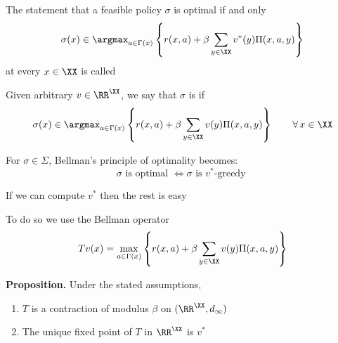 \begin{frame}
    
    The statement that a feasible policy $\sigma$ is optimal if and only 
    \begin{equation*}
        \sigma(x)
        \in \argmax_{a \in \Gamma(x)}
        \left\{
            r(x, a)
            + \beta
            \sum_{y \in \XX} v^*(y) \Pi(x, a, y)
        \right\}
    \end{equation*}
    at every $x \in \XX$ is called 

        \vspace{0.5em}
        \vspace{0.5em}
    Given arbitrary $v \in \RR^\XX$, we say that $\sigma$ is 
     if
    \begin{equation*}
        \sigma(x)
        \in \argmax_{a \in \Gamma(x)}
        \left\{
            r(x, a)
            + \beta
            \sum_{y \in \XX} v(y) \Pi(x, a, y)
        \right\}
        \qquad \forall \, x \in \XX
    \end{equation*}

    For $\sigma \in \Sigma$, Bellman's principle of optimality becomes: 
    \begin{equation*}
        \sigma \text{ is optimal }
        \iff
        \sigma \text{ is $v^*$-greedy }
    \end{equation*}

\end{frame}

\begin{frame}
    

    If we can compute $v^*$ then the rest is easy
        \vspace{0.5em}

    To do so we use the Bellman operator
    \begin{equation*}
        Tv(x)
        = \max_{a \in \Gamma(x)}
        \left\{
            r(x, a)
            + \beta
            \sum_{y \in \XX} v(y) \Pi(x, a, y)
        \right\}
    \end{equation*}

        \vspace{0.5em}
        \vspace{0.5em}
    \textbf{Proposition.}  Under the stated assumptions,
    \begin{enumerate}
        \item $T$ is a contraction of modulus $\beta$ on $(\RR^\XX, d_\infty)$
        \vspace{0.5em}
        \item The unique fixed point of $T$ in $\RR^\XX$ is $v^*$
    \end{enumerate}

\end{frame}



